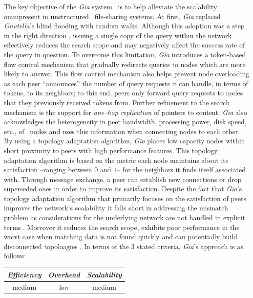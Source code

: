 The key objective of the {\sl Gia} system~\cite{CRBLS2003} is 
to help alleviate the scalability omnipresent
in unstructured \p\ file-sharing systems.
At first, {\sl Gia} replaced {\sl Gnutella}'s blind flooding 
with random walks.
Although this adoption was 
a step in the right direction \cite{LCCLS2002},
issuing a single copy of the query within the network
effectively reduces the search scope and may negatively affect 
the success rate of the query in question.
To overcome this limitation, {\sl Gia} introduces
a token-based flow control mechanism 
that gradually redirects queries to nodes which are more
likely to answer. This flow control mechanism also helps prevent node
overloading as each peer ``announces'' the number of query requests it 
can handle, in terms of tokens, to its neighbors; to this end, 
peers only forward query requests to nodes that they previously
received tokens from. Further refinement to the search mechanism is the
support for \emph{one--hop replication} of pointers to content.
{\sl Gia} also acknowledges the heterogeneity in peer bandwidth,
processing power, disk speed, etc., of \p\ nodes and uses this
information when connecting nodes to each other.
By using a topology adaptation algorithm, 
{\sl Gia} places low capacity nodes within 
short proximity to peers with high performance features.
This topology adaptation algorithm is based on the metric 
each node maintains about its satisfaction --ranging between $0$ and $1$--
for the neighbors it finds itself associated with. 
Through message exchange, a peer can establish new connections 
or drop superseded ones in order to improve its satisfaction.
Despite the fact that {\sl Gia}'s topology adaptation algorithm 
that primarily focuses on the satisfaction of peers improves the network's 
scalability it falls short in addressing the mismatch problem
as considerations for the underlying network are not handled in explicit
terms \cite{LXLNZ2005}. Moreover it reduces the search scope, exhibits poor
performance in the worst case when matching data is not found quickly
\cite{PR2004,HJ2004} and can potentially build  disconnected topoloagies
\cite{MBL2006}.
%
In terms of the $3$ stated criteria, {\sl Gia}'s approach is as follows:
\begin{center}
{\footnotesize
\begin{tabular}{ccc}
\emph{Efficiency} & \emph{Overhead} & \emph{Scalability} \\
\hline
medium &
low &
medium
\end{tabular}
}
\end{center}


